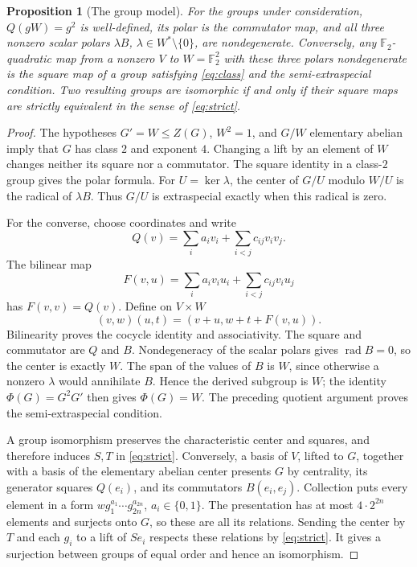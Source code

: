 \documentclass[11pt,a4paper]{article}
\newtheorem{proposition}[theorem]{Proposition}
\theoremstyle{definition}
\theoremstyle{remark}
\numberwithin{equation}{section}
\newcommand{\F}{\mathbb F}
\newcommand{\rad}{\operatorname{rad}}
\begin{document}
\begin{proposition}[The group model]\label{prop:strict}
For the groups under consideration, \(Q(gW)=g^2\) is well-defined,
its polar is the commutator map, and all three nonzero scalar polars
\(\lambda B\), \(\lambda\in W^*\setminus\{0\}\), are nondegenerate.
Conversely, any \(\F_2\)-quadratic map from a nonzero \(V\) to
\(W=\F_2^2\) with these three
polars nondegenerate is the square map of a group satisfying
\eqref{eq:class} and the semi-extraspecial condition.
Two resulting groups are isomorphic if and only if their square maps
are strictly equivalent in the sense of \eqref{eq:strict}.
\end{proposition}
\begin{proof}
The hypotheses \(G'=W\leq Z(G)\), \(W^2=1\), and \(G/W\) elementary
abelian imply that \(G\) has class \(2\) and exponent \(4\).
Changing a lift by an element of \(W\) changes neither its square nor
a commutator. The square identity in a class-\(2\) group gives the polar
formula. For \(U=\ker\lambda\), the center of \(G/U\) modulo \(W/U\)
is the radical of \(\lambda B\). Thus \(G/U\) is extraspecial exactly
when this radical is zero.

For the converse, choose coordinates and write
\[
 Q(v)=\sum_i a_i v_i+\sum_{i<j}c_{ij}v_iv_j.
\]
The bilinear map
\[
 F(v,u)=\sum_i a_iv_iu_i+\sum_{i<j}c_{ij}v_i u_j
\]
has \(F(v,v)=Q(v)\). Define on \(V\times W\)
\begin{equation}\label{eq:group-law}
 (v,w)(u,t)=(v+u,w+t+F(v,u)).
\end{equation}
Bilinearity proves the cocycle identity and associativity. The square
and commutator are \(Q\) and \(B\). Nondegeneracy of the scalar polars
gives \(\rad B=0\), so the center is exactly \(W\).
The span of the values of \(B\) is \(W\), since otherwise a nonzero
\(\lambda\) would annihilate \(B\). Hence the derived subgroup is \(W\);
the identity \(\Phi(G)=G^2G'\) then gives \(\Phi(G)=W\).
The preceding quotient argument proves the semi-extraspecial condition.

A group isomorphism preserves the characteristic center and squares,
and therefore induces \(S,T\) in \eqref{eq:strict}.
Conversely, a basis of \(V\), lifted to \(G\), together with a basis of
the elementary abelian center presents \(G\) by centrality, its
generator squares \(Q(e_i)\), and its commutators \(B(e_i,e_j)\).
Collection puts every element in a form
\(w g_1^{a_1}\cdots g_{2n}^{a_{2n}}\), \(a_i\in\{0,1\}\).
The presentation has at most \(4\cdot2^{2n}\) elements and surjects onto
\(G\), so these are all its relations. Sending the center by \(T\) and
each \(g_i\) to a lift of \(Se_i\) respects these relations by
\eqref{eq:strict}. It gives a surjection between groups of equal order
and hence an isomorphism.
\end{proof}
\end{document}
